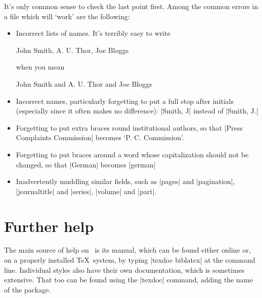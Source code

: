 It's only common sense to check the last point first. Among the common
errors in a file which will `work' are the following:
\begin{itemize}
 \item Incorrect lists of names. It's terribly easy to write
 \begin{pseudoverb}
John Smith, A. U. Thor, Joe Bloggs
 \end{pseudoverb}
 when you mean
 \begin{pseudoverb}
John Smith and A. U. Thor and Joe Bloggs
\end{pseudoverb}
\item Incorrect names, particularly forgetting to put a full stop
  after initials (especially since it often makes no difference):
  |Smith, J| instead of |Smith, J.|
\item Forgetting to put extra braces round institutional authors, so
  that |Press Complaints Commission| becomes `P. C. Commission'.
 \item Forgetting to put braces around a word whose capitalization should not be changed, so that |German| becomes |german|
 \item Inadvertently muddling similar fields, such as |pages| and
   |pagination|, |journaltitle| and |series|, |volume| and |part|.
\end{itemize}

\section{Further help}
The main source of help on \biblatex\ is its manual, which can be
found either online or, on a properly installed \TeX\ system, by
typing |texdoc biblatex| at the command line. Individual styles also
have their own documentation, which is sometimes extensive. That too
can be found using the |texdoc| command, adding the name of the
package.

